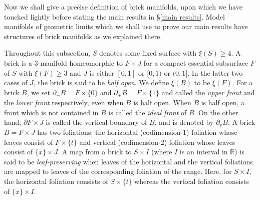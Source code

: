 \documentclass{amsart}
\theoremstyle{definition}
\numberwithin{figure}{section}
\numberwithin{equation}{section}
\newcommand{\blackboard}[1]{\ensuremath{\mathbb{#1}}}
\newcommand{\reals}{\blackboard{R}}
\def\v{\mathrm{v}}
\def\part{\partial}
\begin{document}
Now we shall give a precise definition of  brick manifolds, upon which we have touched lightly before stating the main results in \S\ref{main results}. 
Model manifolds of geometric limits which we shall use to prove our main results have structures of brick manifolds as we explained there.

Throughout this subsection, $S$ denotes some fixed surface with $\xi(S) \geq 4$.
A brick is a $3$-manifold homeomorphic to $F \times J$ for a compact essential subsurface $F$ of $S$ with $\xi(F) \geq 3$ and $J$ is either $[0,1]$ or $[0,1)$ or $(0,1]$.
In the latter two cases of $J$, the  brick is said to be \emph{half open}.
We define $\xi(B)$ to be $\xi(F)$.
For a brick $B$, we set $\part_- B=  F\times \{0\}$ and $\part_+ B= F\times \{1\}$ and called the {\em upper front} and  the {\em lower front} respectively, even when $B$ is half open.
When $B$ is half open, a front which is not contained in $B$ is called the {\em ideal front} of $B$.
On the other hand, $\partial F \times J$ is called the vertical boundary of $B$, and is denoted by $\partial_\v B$.
A brick $B=F \times J$ has two foliations: the horizontal (codimension-1) foliation whose leaves consist of $F \times \{t\}$ and vertical (codimension-2) foliation whose leaves consist of $\{x\} \times J$.
A map from a brick to  $S \times I$ (where $I$ is an interval in $\reals$) is said to be {\em leaf-preserving} when leaves of the horizontal and the vertical foliations are mapped to leaves of the corresponding foliation of the range.
Here, for $S \times I$,  the horizontal foliation consists of $S \times \{t\}$ whereas the vertical foliation consists of $\{x\} \times I$.
\end{document}
